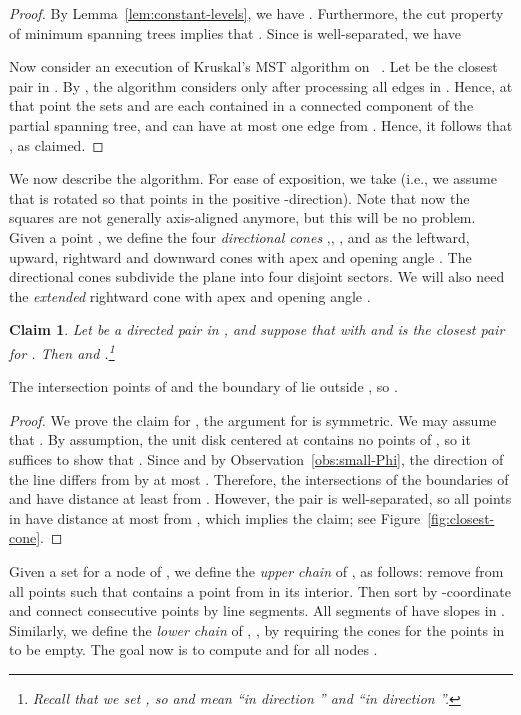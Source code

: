 \documentclass[11pt]{paper}
\newtheorem {claim}[theorem] {Claim}
\begin{document}
\begin{proof}
By Lemma~\ref{lem:constant-levels}, we have .
Furthermore, the cut property of minimum spanning trees implies that
.
Since  is well-separated, we have

Now consider an execution of Kruskal's MST algorithm on
~\cite[Chapter~23.2]{CormenLeRiSt09}.
Let  be the closest pair
in . By , the algorithm
considers  only after processing all edges in
. Hence, at that point
the sets  and  are each contained in a connected component
of the partial spanning tree, and  can have at most one
edge from . Hence, it follows that
, as claimed.
\end{proof}


We now describe the algorithm.
For ease of exposition, we take  (i.e.,
we assume that  is rotated so that  points in the positive
-direction).
Note that now the squares are not generally axis-aligned anymore, but this
will be no problem.
Given a point , we define the four
\emph{directional cones}
,,
, and 
as the leftward, upward, rightward and downward cones with apex  and
opening angle . The directional cones subdivide the plane into
four disjoint sectors. We will also need the \emph{extended} rightward
cone  with apex  and opening
angle .



\begin{claim}\label{clm:emptycone}
Let  be a directed pair in  , 
and suppose that  with  and 
is the closest pair for . 
Then  and
.\footnote{Recall 
that we set ,
so  and  mean ``in direction ''
and ``in direction ''.}
\end{claim}

 {The intersection points of  and the boundary of
 lie outside , so
.}

\begin{proof}
We prove the claim for , the argument for
 is symmetric. We may assume that .
By assumption, the unit disk  centered at  contains no points of ,
so it suffices to show that
.
Since 
and by Observation~\ref{obs:small-Phi}, the direction of the
line  differs from  by at most .
Therefore, the intersections of the boundaries of
 and 
have distance at least  from . However, the
pair  is well-separated, so all points in  have distance at
most  from , which implies the claim;
see Figure~\ref{fig:closest-cone}.
\end{proof}

Given a  set  for a node  of , we define the \emph{upper chain}
of ,  as follows:
remove from  all points  such that
 contains a point from 
in its interior. Then sort  by -coordinate and connect consecutive
points by 
line segments.
All segments of  have slopes in .
Similarly, we define the \emph{lower chain} of , , by requiring
the cones   for the points in  to be
empty. The goal now is to compute  and  for all
nodes .
\end{document}
